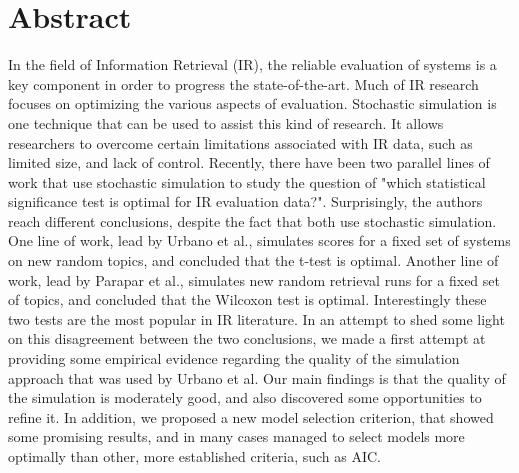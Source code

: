 \chapter*{Abstract}

In the field of Information Retrieval (IR), the reliable evaluation of systems is a key component in order to progress the state-of-the-art. Much of IR research focuses on optimizing the various aspects of evaluation. Stochastic simulation is one technique that can be used to assist this kind of research. It allows researchers to overcome certain limitations associated with IR data, such as limited size, and lack of control. Recently, there have been two parallel lines of work that use stochastic simulation to study the question of "which statistical significance test is optimal for IR evaluation data?". Surprisingly, the authors reach different conclusions, despite the fact that both use stochastic simulation. One line of work, lead by Urbano et al., simulates scores for a fixed set of systems on new random topics, and concluded that the t-test is optimal. Another line of work, lead by Parapar et al., simulates new random retrieval runs for a fixed set of topics, and concluded that the Wilcoxon test is optimal. Interestingly these two tests are the most popular in IR literature. In an attempt to shed some light on this disagreement between the two conclusions, we made a first attempt at providing some empirical evidence regarding the quality of the simulation approach that was used by Urbano et al. Our main findings is that the quality of the simulation is moderately good, and also discovered some opportunities to refine it. In addition, we proposed a new model selection criterion, that showed some promising results, and in many cases managed to select models more optimally than other, more established criteria, such as AIC.
